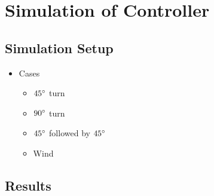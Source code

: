 \section{Simulation of Controller}

\subsection{Simulation Setup}

\begin{itemize}
	\item Cases
	\begin{itemize}
		\item $45\degree$ turn
		\item $90\degree$ turn
		\item $45\degree$ followed by $45\degree$
		\item Wind
	\end{itemize}
\end{itemize}


\subsection{Results}